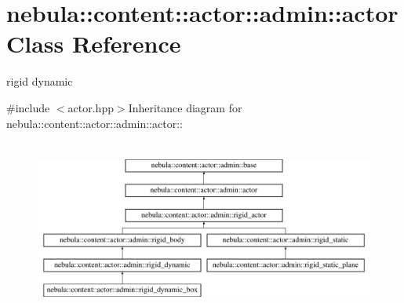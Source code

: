 \hypertarget{classnebula_1_1content_1_1actor_1_1admin_1_1actor}{
\section{nebula::content::actor::admin::actor Class Reference}
\label{classnebula_1_1content_1_1actor_1_1admin_1_1actor}
}


rigid dynamic  


{\ttfamily \#include $<$actor.hpp$>$}Inheritance diagram for nebula::content::actor::admin::actor::\begin{figure}[H]
\begin{center}
\leavevmode
\includegraphics[height=5.7732cm]{classnebula_1_1content_1_1actor_1_1admin_1_1actor}
\end{center}
\end{figure}
